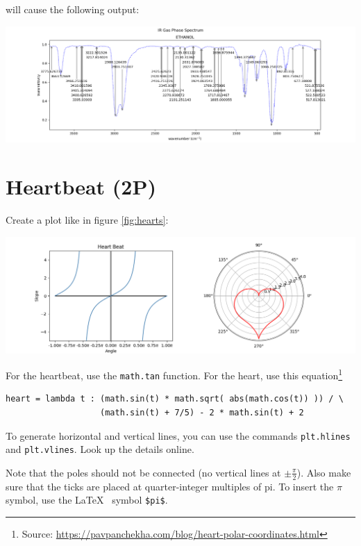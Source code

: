 \documentclass[
	english,
	fontsize=10pt,
	parskip=half,
	titlepage=true,
	DIV=12
]{scrartcl}
\begin{document}
will cause the following output:

\begin{minipage}{\linewidth}
\includegraphics[width=\linewidth]{./task1-endresult-ethanol}
\end{minipage}


\section{Heartbeat (2\;P)}
Create a plot like in figure \ref{fig:hearts}:\\
\begin{minipage}{\linewidth}
\includegraphics[width=\linewidth]{./task2}
\label{fig:hearts}
\end{minipage}

For the heartbeat, use the \texttt{math.tan} function. For the heart, use this equation\footnote{Source: \url{https://pavpanchekha.com/blog/heart-polar-coordinates.html}}
\begin{verbatim}
heart = lambda t : (math.sin(t) * math.sqrt( abs(math.cos(t)) )) / \
                   (math.sin(t) + 7/5) - 2 * math.sin(t) + 2
\end{verbatim}

To generate horizontal and vertical lines, you can use the commands \texttt{plt.hlines} and \texttt{plt.vlines}. Look up the details online.

Note that the poles should not be connected (no vertical lines at $\pm \frac{\pi}{2}$). Also make sure that the ticks are placed at quarter-integer multiples of pi. To insert the $\pi$ symbol, use the \LaTeX~ symbol \texttt{\$pi\$}.
\end{document}
